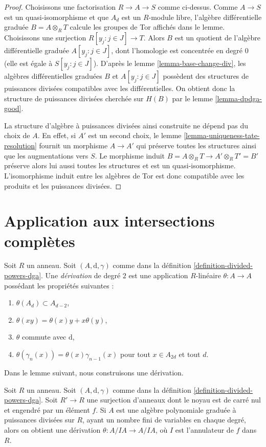 \begin{proof}
Choisissons une factorisation $R \to A \to S$ comme ci-dessus. Comme
$A \to S$ est un quasi-isomorphisme et que $A_d$ est un $R$-module libre,
l'algèbre différentielle graduée $B = A \otimes_R T$ calcule les groupes de
Tor affichés dans le lemme. Choisissons une surjection
$R[y_j:j\in J] \to T$. Alors $B$ est un quotient de l'algèbre différentielle
graduée $A[y_j:j\in J]$, dont l'homologie est concentrée en degré $0$ (elle
est égale à $S[y_j:j\in J]$). D'après le
lemme \ref{lemma-base-change-div}, les algèbres différentielles graduées $B$
et $A[y_j:j\in J]$ possèdent des structures de puissances divisées
compatibles avec les différentielles. On obtient donc la structure de
puissances divisées cherchée sur $H(B)$ par le
lemme \ref{lemma-dpdga-good}.

\medskip\noindent
La structure d'algèbre à puissances divisées ainsi construite ne dépend pas
du choix de $A$. En effet, si $A'$ est un second choix, le
lemme \ref{lemma-uniqueness-tate-resolution} fournit un morphisme
$A \to A'$ qui préserve toutes les structures ainsi que les augmentations
vers $S$. Le morphisme induit
$B = A \otimes_R T \to A' \otimes_R T' = B'$ préserve alors lui aussi toutes
les structures et est un quasi-isomorphisme. L'isomorphisme induit entre les
algèbres de Tor est donc compatible avec les produits et les puissances
divisées.
\end{proof}
\section{Application aux intersections complètes}
\label{section-application-ci}

\noindent
Soit $R$ un anneau. Soit $(A, \text{d}, \gamma)$ comme dans la
définition \ref{definition-divided-powers-dga}.
Une {\it dérivation} de degré $2$ est une application $R$-linéaire
$\theta : A \to A$ possédant les propriétés suivantes :
\begin{enumerate}
\item $\theta(A_d) \subset A_{d - 2}$,
\item $\theta(xy) = \theta(x)y + x\theta(y)$,
\item $\theta$ commute avec $\text{d}$,
\item $\theta(\gamma_n(x)) = \theta(x) \gamma_{n - 1}(x)$
pour tout $x \in A_{2d}$ et tout $d$.
\end{enumerate}
Dans le lemme suivant, nous construisons une dérivation.

\begin{lemma}
\label{lemma-get-derivation}
Soit $R$ un anneau. Soit $(A, \text{d}, \gamma)$ comme dans la
définition \ref{definition-divided-powers-dga}.
Soit $R' \to R$ une surjection d'anneaux dont le noyau
est de carré nul et engendré par un élément $f$.
Si $A$ est une algèbre polynomiale graduée à puissances divisées sur $R$,
ayant un nombre fini de variables en chaque degré,
alors on obtient une dérivation
$\theta : A/IA \to A/IA$, où $I$ est l'annulateur
de $f$ dans $R$.
\end{lemma}

